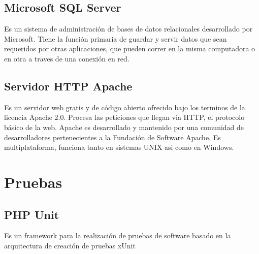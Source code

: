\subsection{Microsoft SQL Server}

Es un sistema de administración de bases de datos relacionales desarrollado por Microsoft. Tiene la función primaria de guardar y servir datos  que sean requeridos por otras aplicaciones, que pueden correr en la misma computadora o en otra a traves de una conexión en red.

\subsection{Servidor HTTP Apache}

Es un servidor web gratis y de código abierto ofrecido bajo los terminos de la licencia Apache 2.0. Procesa las peticiones que llegan via HTTP, el protocolo básico de la web. Apache es desarrollado y mantenido  por una comunidad de desarrolladores pertenecientes a la Fundación de Software Apache. Es multiplataforma, funciona tanto en sistemas UNIX asi como en Windows.

\section{Pruebas}

\subsection{PHP Unit}

Es un framework para la realización de pruebas de software basado en la arquitectura de creación de pruebas xUnit




